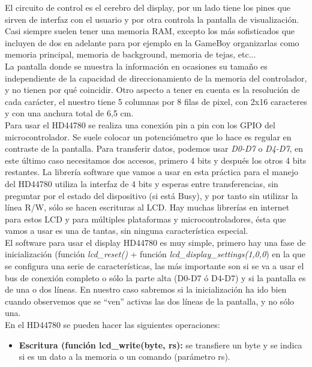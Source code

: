 \documentclass[11pt,a4paper]{article}
\begin{document}
{		El circuito de control es el cerebro del display, por un lado tiene los pines que sirven de interfaz con el usuario y por otra controla la pantalla de visualización. Casi siempre suelen tener una memoria RAM, excepto los más sofisticados que incluyen de dos en adelante para por ejemplo en la GameBoy organizarlas como memoria principal, memoria de background, memoria de tejas, etc...\\
		
		La pantalla donde se muestra la información en ocasiones su tamaño es independiente de la capacidad de direccionamiento de la memoria del controlador, y no tienen por qué coincidir. Otro aspecto a tener en cuenta es la resolución de cada carácter, el nuestro tiene 5 columnas por 8 filas de pixel, con 2x16 caracteres y con una anchura total de 6,5 cm.\\
		
		Para usar el HD44780 se realiza una conexión pin a pin con los GPIO del microcontrolador. Se suele colocar un potenciómetro que lo hace es regular en contraste de la pantalla. Para transferir datos, podemos usar \textit{D0-D7} o \textit{D4-D7}, en este último caso necesitamos dos accesos, primero 4 bits y después los otros 4 bits restantes. La librería software que vamos a usar en esta práctica para el manejo del HD44780 utiliza la interfaz de 4 bits y
		esperas entre transferencias, sin preguntar por el estado del dispositivo (si está Busy), y por tanto sin utilizar la línea
		R/W, sólo se hacen escrituras al LCD. Hay muchas librerías en internet para estos LCD y para múltiples plataformas
		y microcontroladores, ésta que vamos a usar es una de tantas, sin ninguna característica especial.\\
		
		El software para usar el display HD44780 es muy simple, primero hay una fase de inicialización (función \textit{lcd\_reset()} + función \textit{lcd\_display\_settings(1,0,0}) en la que se configura una serie de características, las más importante son si se va a usar el bus de conexión completo o sólo la parte alta (D0-D7 ó D4-D7) y si la pantalla es de una o dos
		líneas. En nuestro caso sabremos si la inicialización ha ido bien cuando observemos que se “ven” activas las dos líneas de la pantalla, y no sólo una.\\
		
		En el HD44780 se pueden hacer las siguientes operaciones:
		\begin{itemize}
			\item \textbf{Escritura (función lcd\_write(byte, rs):} se transfiere un byte y se indica si es un dato a la memoria o un comando (parámetro rs).
			

\end{itemize}}
\end{document}

